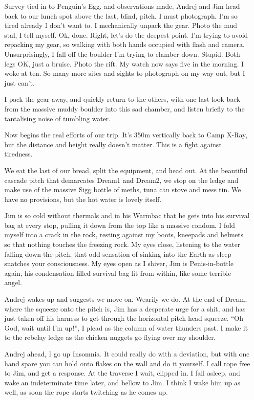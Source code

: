 Survey tied in to Penguin's Egg, and observations made, Andrej and Jim
head back to our lunch spot above the last, blind, pitch. I must
photograph. I'm so tired already I don't want to. I mechanically unpack
the gear. Photo the mud stal, I tell myself. Ok, done. Right, let's do
the deepest point. I'm trying to avoid repacking my gear, so walking
with both hands occupied with flash and camera. Unsurprisingly, I fall
off the boulder I'm trying to clamber down. Stupid. Both legs OK, just a
bruise. Photo the rift. My watch now says five in the morning. I woke at
ten. So many more sites and sights to photograph on my way out, but I
just can't.

I pack the gear away, and quickly return to the others, with one last
look back from the massive muddy boulder into this sad chamber, and
listen briefly to the tantalising noise of tumbling water.

Now begins the real efforts of our trip. It's 350m vertically back to
Camp X-Ray, but the distance and height really doesn't matter. This is a
fight against tiredness.

We eat the last of our bread, split the equipment, and head out. At the
beautiful cascade pitch that demarcates Dream1 and Dream2, we stop on
the ledge and make use of the massive Sigg bottle of meths, tuna can
stove and mess tin. We have no provisions, but the hot water is lovely
itself.

Jim is so cold without thermals and in his Warmbac that he gets into his
survival bag at every stop, pulling it down from the top like a massive
condom. I fold myself into a crack in the rock, resting against my
boots, kneepads and helmets so that nothing touches the freezing rock.
My eyes close, listening to the water falling down the pitch, that odd
sensation of sinking into the Earth as sleep snatches your
consciousness. My eyes open as I shiver, Jim is Penis-in-bottle again,
his condensation filled survival bag lit from within, like some terrible
angel.

Andrej wakes up and suggests we move on. Wearily we do. At the end of
Dream, where the squeeze onto the pitch is, Jim has a desperate urge for
a shit, and has just taken off his harness to get through the horizontal
pitch head squeeze. ``Oh God, wait until I'm up!'', I plead as the
column of water thunders past. I make it to the rebelay ledge as the
chicken nuggets go flying over my shoulder.

Andrej ahead, I go up Insomnia. It could really do with a deviation, but
with one hand spare you can hold onto flakes on the wall and do it
yourself. I call rope free to Jim, and get a response. At the traverse I
wait, clipped in. I fall asleep, and wake an indeterminate time later,
and bellow to Jim. I think I wake him up as well, as soon the rope
starts twitching as he comes up.

